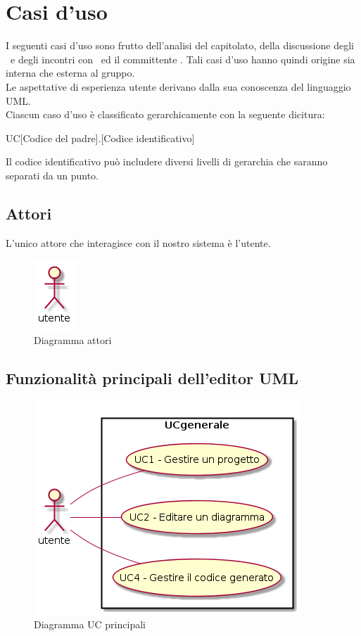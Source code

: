 \documentclass[../AnalisiDeiRequisiti.tex]{subfiles}
\begin{document}
	\section{Casi d'uso}
	I seguenti casi d'uso sono frutto dell'analisi del capitolato, della discussione degli
	\analisti\ e degli incontri con	\proponente\ ed il committente \vardanega.
	Tali casi d'uso hanno quindi origine sia interna che esterna al gruppo.\\
	Le aspettative di esperienza utente derivano dalla sua conoscenza del
	linguaggio UML.\\
	Ciascun caso d'uso è classificato gerarchicamente con la seguente dicitura:
	\begin{center}
		UC[Codice del padre].[Codice identificativo]
	\end{center}
	Il codice identificativo può includere diversi livelli di gerarchia che saranno
	separati da un punto.
	\subsection{Attori}
		L'unico attore che interagisce con il nostro sistema è l'utente.
		\begin{figure} [H]
			\centering
			\includegraphics[scale=0.45]{./Figures/utente.png}
			\caption{Diagramma attori}\label{}
		\end{figure}
	\subsection{Funzionalità principali dell'editor UML}
		\begin{figure} [H]
			\centering
			\includegraphics[scale=0.45]{./Figures/UCgenerale.png}
			\caption{Diagramma UC principali}\label{}
		\end{figure}
\end{document}
